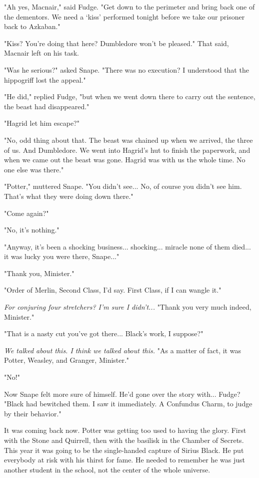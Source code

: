 "Ah yes, Macnair," said Fudge. "Get down to the perimeter and bring back one of the dementors. We need a `kiss' performed tonight before we take our prisoner back to Azkaban."

"Kiss? You're doing that here? Dumbledore won't be pleased." That said, Macnair left on his task.

"Was he serious?" asked Snape. "There was no execution? I understood that the hippogriff lost the appeal."

"He did," replied Fudge, "but when we went down there to carry out the sentence, the beast had disappeared."

"Hagrid let him escape?"

"No, odd thing about that. The beast was chained up when we arrived, the three of us. And Dumbledore. We went into Hagrid's hut to finish the paperwork, and when we came out the beast was gone. Hagrid was with us the whole time. No one else was there."

"Potter," muttered Snape. "You didn't see... No, of course you didn't see him. That's what they were doing down there."

"Come again?"

"No, it's nothing."

"Anyway, it's been a shocking business... shocking... miracle none of them died... it was lucky you were there, Snape..."

"Thank you, Minister."

"Order of Merlin, Second Class, I'd say. First Class, if I can wangle it."

\emph{For conjuring four stretchers? I'm sure I didn't...} "Thank you very much indeed, Minister."

"That is a nasty cut you've got there... Black's work, I suppose?"

\emph{We talked about this. I think we talked about this.} "As a matter of fact, it was Potter, Weasley, and Granger, Minister."

"No!"

Now Snape felt more sure of himself. He'd gone over the story with... Fudge? "Black had bewitched them. I saw it immediately. A Confundus Charm, to judge by their behavior."

It was coming back now. Potter was getting too used to having the glory. First with the Stone and Quirrell, then with the basilisk in the Chamber of Secrets. This year it was going to be the single-handed capture of Sirius Black. He put everybody at risk with his thirst for fame. He needed to remember he was just another student in the school, not the center of the whole universe.

